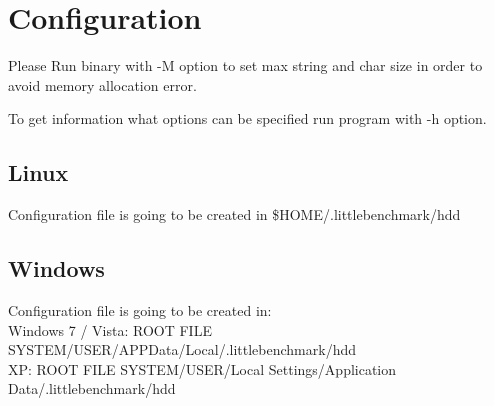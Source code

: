 \hypertarget{Configuration}{
\section{Configuration}
\label{Configuration}
}
Please Run binary with -M option to set max string and char size in order to avoid memory allocation error.

To get information what options can be specified run program with -h option.
\subsection{Linux}
Configuration file is going to be created in \$HOME/.littlebenchmark/hdd
\subsection{Windows}
Configuration file is going to be created in:\\
Windows 7 / Vista: ROOT FILE SYSTEM/USER/APPData/Local/.littlebenchmark/hdd\\
XP: ROOT FILE SYSTEM/USER/Local Settings/Application Data/.littlebenchmark/hdd\\
